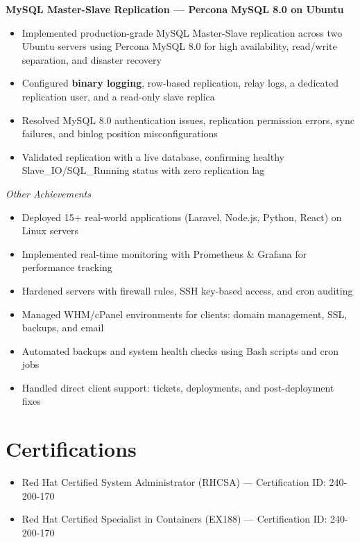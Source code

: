 \documentclass[11pt,a4paper]{article}
\newcommand{\role}[2]{%
  \noindent\textbf{#1}\hfill\textit{\textcolor{midgray}{#2}}\par\vspace{1pt}
}
\begin{document}
\role{MySQL Master-Slave Replication --- Percona MySQL 8.0 on Ubuntu}{}
\begin{itemize}
  \item Implemented production-grade MySQL Master-Slave replication across two Ubuntu servers using Percona MySQL 8.0 for high availability, read/write separation, and disaster recovery
  \item Configured \textbf{binary logging}, row-based replication, relay logs, a dedicated replication user, and a read-only slave replica
  \item Resolved MySQL 8.0 authentication issues, replication permission errors, sync failures, and binlog position misconfigurations
  \item Validated replication with a live database, confirming healthy Slave\_IO/SQL\_Running status with zero replication lag
\end{itemize}

\textit{\textcolor{midgray}{Other Achievements}}
\begin{itemize}
  \item Deployed 15+ real-world applications (Laravel, Node.js, Python, React) on Linux servers
  \item Implemented real-time monitoring with Prometheus \& Grafana for performance tracking
  \item Hardened servers with firewall rules, SSH key-based access, and cron auditing
  \item Managed WHM/cPanel environments for clients: domain management, SSL, backups, and email
  \item Automated backups and system health checks using Bash scripts and cron jobs
  \item Handled direct client support: tickets, deployments, and post-deployment fixes
\end{itemize}

\section*{Certifications}
\small
\begin{itemize}
  \item Red Hat Certified System Administrator (RHCSA) --- Certification ID: 240-200-170
  \item Red Hat Certified Specialist in Containers (EX188) --- Certification ID: 240-200-170
\end{itemize}
\end{document}
